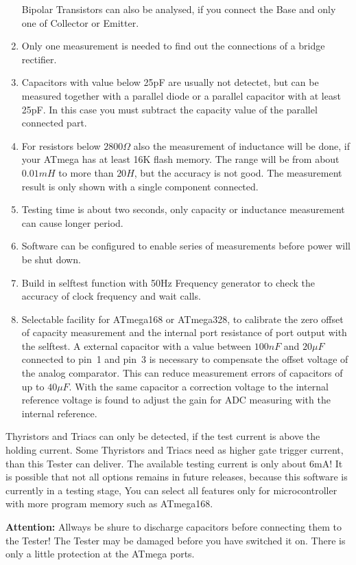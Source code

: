 \begin{enumerate}
Bipolar Transistors can also be analysed, if you connect the Base and only one of Collector or Emitter.
\item Only one measurement is needed to find out the connections of a bridge rectifier.
\item Capacitors with value below 25pF are usually not detectet, but can be measured together with
a parallel diode or a parallel capacitor with at least 25pF.
In this case you must subtract the capacity value of the parallel connected part.
\item For resistors below \(2800 \Omega\) also the measurement of inductance will be done, if
your ATmega has at least 16K flash memory.
The range will be from about \(0.01 mH\) to more than \(20 H\), but the accuracy is not good.
The measurement result is only shown with a single component connected.
\item Testing time is about two seconds, only capacity or inductance measurement can cause longer period.
\item Software can be configured to enable series of measurements before power will be shut down.
\item Build in selftest function with 50Hz Frequency generator to check the accuracy of clock frequency and wait calls.
\item Selectable facility for ATmega168 or ATmega328, to calibrate the zero offset of capacity measurement and the
internal port resistance of port output with the selftest. A external capacitor with a value between \(100 nF\) 
and \(20 \mu F\) connected to pin~1 and pin~3 is necessary to compensate the offset voltage of the analog comparator.
This can reduce measurement errors of capacitors of up to \(40 \mu F\).
With the same capacitor a correction voltage to the internal reference voltage is found to adjust the
gain for ADC measuring with the internal reference.
\end{enumerate}

Thyristors and Triacs can only be detected, if the test current is above the holding current.
Some Thyristors and Triacs need as higher gate trigger current, than this Tester can deliver.
The available testing current is only about 6mA!
It is possible that not all options remains in future releases, because this software is currently in a testing stage,
You can select all features only for microcontroller with more program memory such as ATmega168.

\vspace{1cm}
\textbf{{\Large Attention:}} Allways be shure to discharge capacitors before connecting them to the Tester!
The Tester may be damaged before you have switched it on. There is only a little protection at the ATmega ports.


